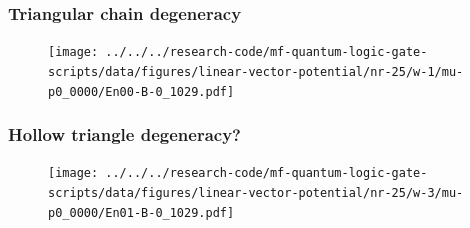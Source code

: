 \documentclass[xcolor=dvipsnames,10pt,aspectratio=169]{beamer}
\begin{document}
  \begin{frame}
    \frametitle{Triangular chain degeneracy}

    \begin{figure}
      \texttt{[image: ../../../research-code/mf-quantum-logic-gate-scripts/data/figures/linear-vector-potential/nr-25/w-1/mu-p0\_0000/En00-B-0\_1029.pdf]}
    \end{figure}

  \end{frame}

  \begin{frame}
    \frametitle{Hollow triangle degeneracy?}

    \begin{figure}
      \texttt{[image: ../../../research-code/mf-quantum-logic-gate-scripts/data/figures/linear-vector-potential/nr-25/w-3/mu-p0\_0000/En01-B-0\_1029.pdf]}
    \end{figure}

  \end{frame}
\end{document}
